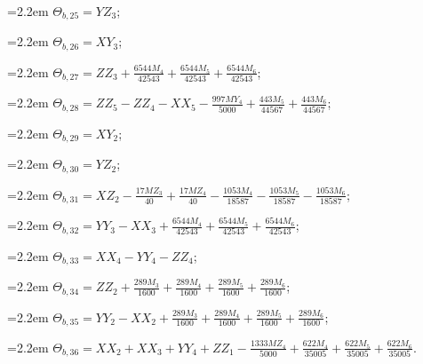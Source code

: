 {\hangindent=2.2em $\Theta_{b,25}=YZ_{3}$;\par
\hangindent=2.2em $\Theta_{b,26}=XY_{3}$;\par
\hangindent=2.2em $\Theta_{b,27}=ZZ_{3}+\tfrac{6544M_{4}}{42543}+\tfrac{6544M_{5}}{42543}+\tfrac{6544M_{6}}{42543}$;\par
\hangindent=2.2em $\Theta_{b,28}=ZZ_{5}-ZZ_{4}-XX_{5}-\tfrac{997MY_{4}}{5000}+\tfrac{443M_{5}}{44567}+\tfrac{443M_{6}}{44567}$;\par
\hangindent=2.2em $\Theta_{b,29}=XY_{2}$;\par
\hangindent=2.2em $\Theta_{b,30}=YZ_{2}$;\par
\hangindent=2.2em $\Theta_{b,31}=XZ_{2}-\tfrac{17MZ_{3}}{40}+\tfrac{17MZ_{4}}{40}-\tfrac{1053M_{4}}{18587}-\tfrac{1053M_{5}}{18587}-\tfrac{1053M_{6}}{18587}$;\par
\hangindent=2.2em $\Theta_{b,32}=YY_{3}-XX_{3}+\tfrac{6544M_{4}}{42543}+\tfrac{6544M_{5}}{42543}+\tfrac{6544M_{6}}{42543}$;\par
\hangindent=2.2em $\Theta_{b,33}=XX_{4}-YY_{4}-ZZ_{4}$;\par
\hangindent=2.2em $\Theta_{b,34}=ZZ_{2}+\tfrac{289M_{3}}{1600}+\tfrac{289M_{4}}{1600}+\tfrac{289M_{5}}{1600}+\tfrac{289M_{6}}{1600}$;\par
\hangindent=2.2em $\Theta_{b,35}=YY_{2}-XX_{2}+\tfrac{289M_{3}}{1600}+\tfrac{289M_{4}}{1600}+\tfrac{289M_{5}}{1600}+\tfrac{289M_{6}}{1600}$;\par
\hangindent=2.2em $\Theta_{b,36}=XX_{2}+XX_{3}+YY_{4}+ZZ_{1}-\tfrac{1333MZ_{4}}{5000}+\tfrac{622M_{4}}{35005}+\tfrac{622M_{5}}{35005}+\tfrac{622M_{6}}{35005}$.\par
}
